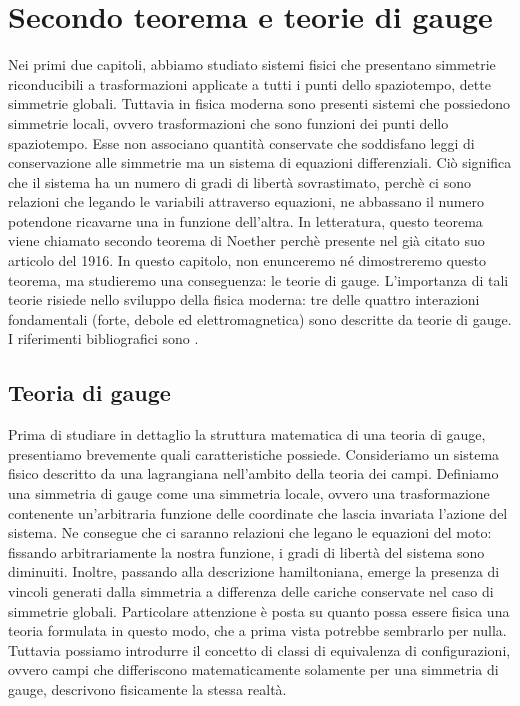 \chapter{Secondo teorema e teorie di gauge}

    Nei primi due capitoli, abbiamo studiato sistemi fisici che presentano simmetrie riconducibili a trasformazioni applicate a tutti i punti dello spaziotempo, dette simmetrie globali. Tuttavia in fisica moderna sono presenti sistemi che possiedono simmetrie locali, ovvero trasformazioni che sono funzioni dei punti dello spaziotempo. Esse non associano quantità conservate che soddisfano leggi di conservazione alle simmetrie ma un sistema di equazioni differenziali. Ciò significa che il sistema ha un numero di gradi di libertà sovrastimato, perchè ci sono relazioni che legando le variabili attraverso equazioni, ne abbassano il numero potendone ricavarne una in funzione dell'altra. In letteratura, questo teorema viene chiamato secondo teorema di Noether perchè presente nel già citato suo articolo del 1916. In questo capitolo, non enunceremo né dimostreremo questo teorema, ma studieremo una conseguenza: le teorie di gauge. L'importanza di tali teorie risiede nello sviluppo della fisica moderna: tre delle quattro interazioni fondamentali (forte, debole ed elettromagnetica) sono descritte da teorie di gauge. I riferimenti bibliografici sono \cite{barone} \cite{banados}.

\section{Teoria di gauge}
    Prima di studiare in dettaglio la struttura matematica di una teoria di gauge, presentiamo brevemente quali caratteristiche possiede. Consideriamo un sistema fisico descritto da una lagrangiana nell'ambito della teoria dei campi. Definiamo una simmetria di gauge come una simmetria locale, ovvero una trasformazione contenente un'arbitraria funzione delle coordinate che lascia invariata l'azione del sistema. Ne consegue che ci saranno relazioni che legano le equazioni del moto: fissando arbitrariamente la nostra funzione, i gradi di libertà del sistema sono diminuiti. Inoltre, passando alla descrizione hamiltoniana, emerge la presenza di vincoli generati dalla simmetria a differenza delle cariche conservate nel caso di simmetrie globali. Particolare attenzione è posta su quanto possa essere fisica una teoria formulata in questo modo, che a prima vista potrebbe sembrarlo per nulla. Tuttavia possiamo introdurre il concetto di classi di equivalenza di configurazioni, ovvero campi che differiscono matematicamente solamente per una simmetria di gauge, descrivono fisicamente la stessa realtà. 
    
